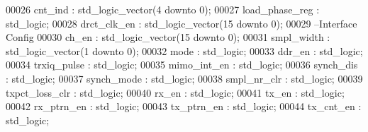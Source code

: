 \begin{DoxyCode}
00026       \textcolor{vhdlchar}{cnt_ind}        \textcolor{vhdlchar}{:} \textcolor{comment}{std\_logic\_vector}\textcolor{vhdlchar}{(}\textcolor{vhdllogic}{}\textcolor{vhdllogic}{4} \textcolor{keywordflow}{downto} \textcolor{vhdllogic}{}\textcolor{vhdllogic}{0}\textcolor{vhdlchar}{)};
00027       \textcolor{vhdlchar}{load_phase_reg} \textcolor{vhdlchar}{:} \textcolor{comment}{std\_logic};
00028       \textcolor{vhdlchar}{drct_clk_en}    \textcolor{vhdlchar}{:} \textcolor{comment}{std\_logic\_vector}\textcolor{vhdlchar}{(}\textcolor{vhdllogic}{}\textcolor{vhdllogic}{15} \textcolor{keywordflow}{downto} \textcolor{vhdllogic}{}\textcolor{vhdllogic}{0}\textcolor{vhdlchar}{)};
00029 \textcolor{keyword}{      --Interface Config}
00030       \textcolor{vhdlchar}{ch_en}          \textcolor{vhdlchar}{:} \textcolor{comment}{std\_logic\_vector}\textcolor{vhdlchar}{(}\textcolor{vhdllogic}{}\textcolor{vhdllogic}{15} \textcolor{keywordflow}{downto} \textcolor{vhdllogic}{}\textcolor{vhdllogic}{0}\textcolor{vhdlchar}{)};
00031       \textcolor{vhdlchar}{smpl_width}     \textcolor{vhdlchar}{:} \textcolor{comment}{std\_logic\_vector}\textcolor{vhdlchar}{(}\textcolor{vhdllogic}{}\textcolor{vhdllogic}{1} \textcolor{keywordflow}{downto} \textcolor{vhdllogic}{}\textcolor{vhdllogic}{0}\textcolor{vhdlchar}{)};
00032       \textcolor{vhdlchar}{mode}           \textcolor{vhdlchar}{:} \textcolor{comment}{std\_logic};
00033       \textcolor{vhdlchar}{ddr_en}         \textcolor{vhdlchar}{:} \textcolor{comment}{std\_logic};
00034       \textcolor{vhdlchar}{trxiq_pulse}    \textcolor{vhdlchar}{:} \textcolor{comment}{std\_logic};
00035       \textcolor{vhdlchar}{mimo_int_en}    \textcolor{vhdlchar}{:} \textcolor{comment}{std\_logic};
00036       \textcolor{vhdlchar}{synch_dis}      \textcolor{vhdlchar}{:} \textcolor{comment}{std\_logic};
00037       \textcolor{vhdlchar}{synch_mode}     \textcolor{vhdlchar}{:} \textcolor{comment}{std\_logic};
00038       \textcolor{vhdlchar}{smpl_nr_clr}    \textcolor{vhdlchar}{:} \textcolor{comment}{std\_logic};
00039       \textcolor{vhdlchar}{txpct_loss_clr} \textcolor{vhdlchar}{:} \textcolor{comment}{std\_logic};
00040       \textcolor{vhdlchar}{rx_en}          \textcolor{vhdlchar}{:} \textcolor{comment}{std\_logic};
00041       \textcolor{vhdlchar}{tx_en}          \textcolor{vhdlchar}{:} \textcolor{comment}{std\_logic};
00042       \textcolor{vhdlchar}{rx_ptrn_en}     \textcolor{vhdlchar}{:} \textcolor{comment}{std\_logic};
00043       \textcolor{vhdlchar}{tx_ptrn_en}     \textcolor{vhdlchar}{:} \textcolor{comment}{std\_logic};
00044       \textcolor{vhdlchar}{tx_cnt_en}      \textcolor{vhdlchar}{:} \textcolor{comment}{std\_logic};

\end{DoxyCode}
